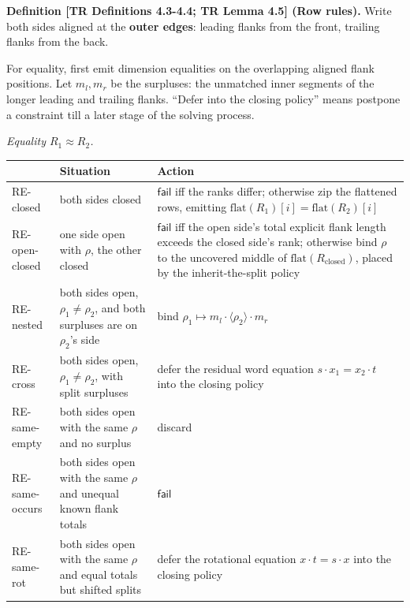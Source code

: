 \documentclass[
  10pt,
  letterpaper,
]{article}
\begin{document}
\textbf{Definition {[}TR Definitions 4.3-4.4; TR Lemma 4.5{]} (Row
rules).} Write both sides aligned at the \textbf{outer edges}: leading
flanks from the front, trailing flanks from the back.

For equality, first emit dimension equalities on the overlapping aligned
flank positions. Let \(m_l, m_r\) be the surpluses: the unmatched inner
segments of the longer leading and trailing flanks. ``Defer into the
closing policy'' means postpone a constraint till a later stage of the
solving process.

\emph{Equality \(R_1 \approx R_2\).}

\begin{longtable}[]{@{}
  >{\raggedright\arraybackslash}p{}
  >{\raggedright\arraybackslash}p{}
  >{\raggedright\arraybackslash}p{}@{}}
\toprule\noalign{}
\begin{minipage}[b]{\linewidth}\raggedright
\end{minipage} & \begin{minipage}[b]{\linewidth}\raggedright
Situation
\end{minipage} & \begin{minipage}[b]{\linewidth}\raggedright
Action
\end{minipage} \\
\midrule\noalign{}
\endhead
\bottomrule\noalign{}
\endlastfoot
RE-closed & both sides closed & \(\mathsf{fail}\) iff the ranks differ;
otherwise zip the flattened rows, emitting
\(\mathrm{flat}(R_1)[i] = \mathrm{flat}(R_2)[i]\) \\
RE-open-closed & one side open with \(\rho\), the other closed &
\(\mathsf{fail}\) iff the open side's total explicit flank length
exceeds the closed side's rank; otherwise bind \(\rho\) to the uncovered
middle of \(\mathrm{flat}(R_{\mathrm{closed}})\), placed by the
inherit-the-split policy \\
RE-nested & both sides open, \(\rho_1 \ne \rho_2\), and both surpluses
are on \(\rho_2\)'s side & bind
\(\rho_1 \mapsto m_l \cdot \langle\rho_2\rangle \cdot m_r\) \\
RE-cross & both sides open, \(\rho_1 \ne \rho_2\), with split surpluses
& defer the residual word equation \(s \cdot x_1 = x_2 \cdot t\) into
the closing policy \\
RE-same-empty & both sides open with the same \(\rho\) and no surplus &
discard \\
RE-same-occurs & both sides open with the same \(\rho\) and unequal
known flank totals & \(\mathsf{fail}\) \\
RE-same-rot & both sides open with the same \(\rho\) and equal totals
but shifted splits & defer the rotational equation
\(x \cdot t = s \cdot x\) into the closing policy \\
\end{longtable}
\end{document}
